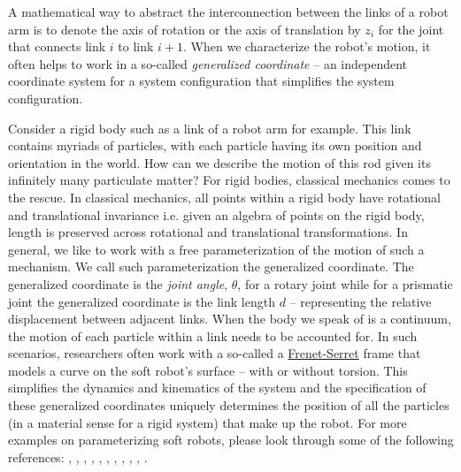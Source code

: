  A mathematical way to abstract the interconnection between the links of a robot arm is to denote the axis of rotation or the axis of translation by $z_i$ for the joint that connects link $i$ to link $i+1$. When we characterize the robot's motion, it often helps to work in a so-called \textit{generalized coordinate} -- an independent coordinate system for a system configuration that simplifies the system configuration.
 
Consider a rigid body such as a link of a robot arm for example. This link contains myriads of particles, with each particle having its own position and orientation in the world. How can we describe the motion of this rod given its infinitely many particulate matter? For rigid bodies, classical mechanics comes to the rescue. In classical mechanics, all points within a rigid body have rotational and translational invariance i.e. given an algebra of points on the rigid body, length is preserved across rotational and translational transformations. In general, we like to work with a free parameterization of the motion of such a mechanism. We call such parameterization the generalized coordinate. The generalized coordinate is the \textit{joint angle}, $\theta$, for a rotary joint while for a prismatic joint the generalized coordinate is the link length $d$ -- representing the relative displacement between adjacent links. When the body we speak of is a continuum, the motion of each particle within a link needs to be accounted for. In such scenarios, researchers often work with a so-called a \href{http://web.mit.edu/hyperbook/Patrikalakis-Maekawa-Cho/node25.html}{Frenet-Serret} frame that models  a curve on the soft robot's surface -- with or without torsion. This simplifies the dynamics and kinematics of the system and the specification of these generalized coordinates uniquely determines the position of all the particles (in a material sense for a rigid system) that make up the robot. For more examples on parameterizing soft robots, please look through some of the following references: \cite{Ogunmolu15CASE}, \cite{Hannan2000} \cite{Ogunmolu16CASE}, \cite{Renda2018ICRA}, \cite{ShepherdMultigait}, \cite{Hannan2003}, \cite{Ogunmolu17IROS}, \cite{Laschi15NeuNet}, \cite{Ogunmolu19RALI}, \cite{Renda2014Cosserat}, \cite{Ogunmolu19RALII}, \cite{OgunmoluThesis}.
 
% 
 
